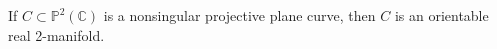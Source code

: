 If $C \subset \mathbb{P}^2(\mathbb{C})$ is a nonsingular projective plane curve, then $C$ is an orientable real 2-manifold.
